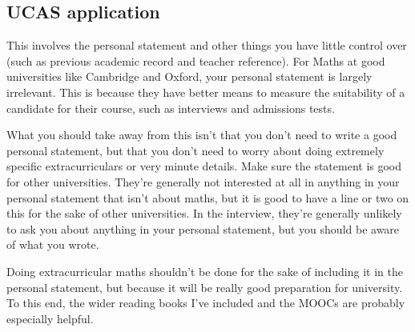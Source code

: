 \documentclass[11pt]{article}
\begin{document}
\begin{center}
{
}
\end{center}


\subsection{UCAS application}

This involves the personal statement and other things you have little control over (such as previous academic record and teacher reference).  For Maths at good universities like Cambridge and Oxford, your personal statement is largely irrelevant. This is because they have better means to measure the suitability of a
candidate for their course, such as interviews and admissions tests.

What you should take away from this isn’t that you don’t need to write a good personal statement, but that
you don’t need to worry about doing extremely specific extracurriculars or very minute details. Make sure the statement is good for other universities. They’re generally not interested at all in anything in your personal statement that isn’t about maths, but
it is good to have a line or two on this for the sake of other universities. In the interview, they’re generally
unlikely to ask you about anything in your personal statement, but you should be aware of what you wrote. 

Doing extracurricular maths shouldn't be done for the sake of including it in the personal statement, but because it will be really good preparation for university. To this end, the wider reading books I've included and the MOOCs are probably especially helpful. 
\end{document}
